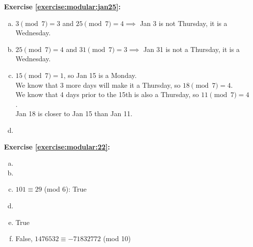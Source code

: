 \noindent\textbf{Exercise \ref{exercise:modular:jan25}:} %
\begin{enumerate}[(a)]
\item
$3\pmod{7} = 3$ and $25\pmod{7} = 4 \implies$ Jan 3 is not Thursday, it is a Wednesday.

\item
$25\pmod{7} = 4$ and $31\pmod{7} = 3 \implies$ Jan 31 is not a Thursday, it is a Wednesday.

\item
$15\pmod{7} = 1$, so Jan 15 is a Monday.\\
We know that 3 more days will make it a Thursday, so $18\pmod{7} = 4$.\\
We know that 4 days prior to the 15th is also a Thursday, so $11\pmod{7} = 4$.\\
Jan 18 is closer to Jan 15 than Jan 11.

\item
\end{enumerate}

\noindent\textbf{Exercise \ref{exercise:modular:22}:}
\begin{enumerate}[(a)]
\item
 
 \item

\item
$101 \equiv 29$ (mod 6): True

\item

\item
True

\item
False, $1476532 \equiv -71832772$ (mod 10)
\end{enumerate}

